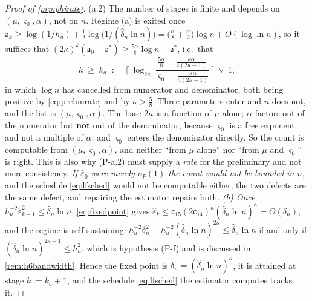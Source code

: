 \begin{proof}[Proof of \cref{prp:phirate}]
(a.2) The number of stages is finite and depends on $(\mu,\varsigma_0,\alpha)$, not on $n$.
Regime (a) is exited once
$\mathsf a_k\ge\log(1/h_u)+\tfrac12\log\big(1/(\hat\delta_n\ln n)\big)=\big(\tfrac{\alpha}{8}+\tfrac{\alpha}{2}\big)\log n+O(\log\ln n)$,
so it suffices that $(2\kappa)^{k}(\mathsf a_0-\mathsf a^{\ast})\ge\tfrac{5\alpha}{8}\log n-\mathsf a^{\ast}$,
i.e.\ that
\[
k\;\ge\;\bar k_a\;:=\;\Big\lceil\ \log_{2\kappa}\
\frac{\tfrac{5\alpha}{8}-\tfrac{\kappa\alpha}{4(2\kappa-1)}}
     {\varsigma_0-\tfrac{\kappa\alpha}{4(2\kappa-1)}}\ \Big\rceil\ \vee\ 1 ,
\]
in which $\log n$ has cancelled from numerator and denominator, both being positive by
\eqref{eq:prelimrate} and by $\kappa>\tfrac58$. Three parameters enter and $n$ does not, and the
list is $(\mu,\varsigma_0,\alpha)$. The base $2\kappa$ is a function of $\mu$ alone; $\alpha$ factors
out of the numerator but \textbf{not} out of the denominator, because $\varsigma_0$ is a free exponent
and not a multiple of $\alpha$; and $\varsigma_0$ enters the denominator directly. So the count
is computable from $(\mu,\varsigma_0,\alpha)$, and neither ``from $\mu$ alone'' nor ``from $\mu$ and
$\varsigma_0$'' is right. This is also why (P-a.2) must supply a \emph{rate} for the
preliminary and not mere consistency. \emph{If
$\hat\varepsilon_0$ were merely $o_P(1)$ the count would not be bounded in $n$}, and the schedule
\eqref{eq:lfsched} would not be computable either, the two defects are the same defect, and
repairing the estimator repairs both.
\emph{(b) Once $h_u^{-2}\hat\varepsilon_{k-1}^{2}\le\hat\delta_n\ln n$}, \eqref{eq:fixedpoint}
gives $\hat\varepsilon_k\le\mathsf c_{15}(2\mathsf c_{14})^{\kappa}(\hat\delta_n\ln n)^{\kappa}=O(\delta_n)$, and the
regime is self-sustaining: $h_u^{-2}\delta_n^{2}=h_u^{-2}(\hat\delta_n\ln n)^{2\kappa}\le\hat\delta_n\ln n$
if and only if $(\hat\delta_n\ln n)^{2\kappa-1}\le h_u^{2}$, which is hypothesis (P-f) and is discussed
in \cref{rem:h6bandwidth}. Hence the fixed point is $\delta_n=(\hat\delta_n\ln n)^{\kappa}$, it is
attained at stage $\bar k:=\bar k_a+1$, and the schedule \eqref{eq:lfsched} the estimator computes
tracks it.


\end{proof}
